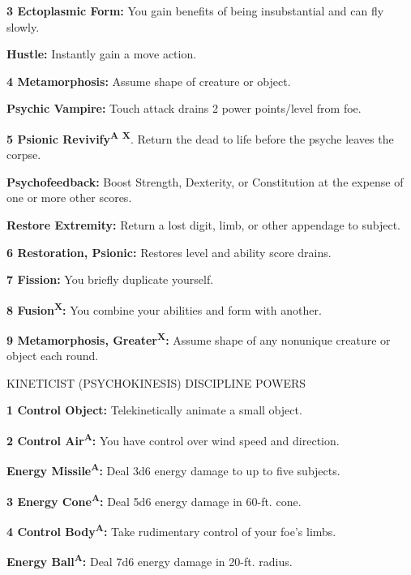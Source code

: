 \documentclass{article}
\begin{document}
\parindent=-15pt
\textbf{3 Ectoplasmic Form: }You gain benefits of being insubstantial and can fly 
slowly.

\parindent=0pt
\textbf{Hustle: }Instantly gain a move action. 

\parindent=-15pt
\textbf{4 Metamorphosis: }Assume shape of creature or object.

\parindent=0pt
\textbf{Psychic Vampire: }Touch attack drains 2 power points/level from foe.

\parindent=-15pt
\textbf{5 Psionic Revivify}\textsuperscript{\textbf{A}}{\scriptsize{}\textbf{ }}\textsuperscript{\textbf{X}}. 
Return the dead to life before the psyche leaves the corpse.\textbf{ }

\parindent=0pt
\textbf{Psychofeedback: }Boost Strength, Dexterity, or Constitution at the expense 
of one or more other scores.

\textbf{Restore Extremity: }Return a lost digit, limb, or other appendage to subject.

\parindent=-15pt
\textbf{6 Restoration, Psionic: }Restores level and ability score drains.

\textbf{7 Fission: }You briefly duplicate yourself.

\textbf{8 Fusion}\textsuperscript{\textbf{X}}\textbf{: }You combine your abilities 
and form with another.

\textbf{9 Metamorphosis, Greater}\textsuperscript{\textbf{X}}\textbf{: }Assume 
shape of any nonunique creature or object each round.

\vspace{12pt}
KINETICIST (PSYCHOKINESIS) DISCIPLINE POWERS

\textbf{1 Control Object:} Telekinetically animate a small object.

\textbf{2 Control Air}\textsuperscript{\textbf{A}}\textbf{:} You have control over 
wind speed and direction.

\parindent=0pt
\textbf{Energy Missile}\textsuperscript{\textbf{A}}\textbf{:} Deal 3d6 energy damage 
to up to five subjects.

\parindent=-15pt
\textbf{3 Energy Cone}\textsuperscript{\textbf{A}}\textbf{:} Deal 5d6 energy damage 
in 60-ft. cone.

\textbf{4 Control Body}\textsuperscript{\textbf{A}}\textbf{:} Take rudimentary 
control of your foe's limbs.

\parindent=0pt
\textbf{Energy Ball}\textsuperscript{\textbf{A}}\textbf{:} Deal 7d6 energy damage 
in 20-ft. radius.
\end{document}
